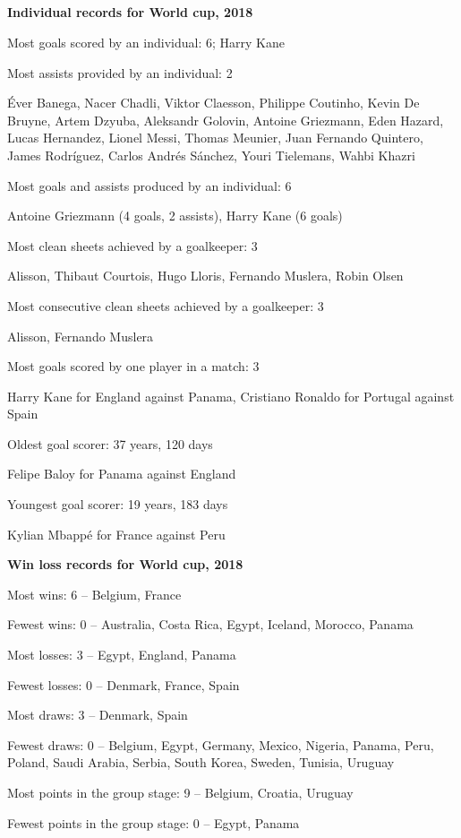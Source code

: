
\subsection*{}

\begin{questions}

\question \textbf{Individual records for World cup, 2018}

\begin{solution}

Most goals scored by an individual: 6; Harry Kane

Most assists provided by an individual: 2

Éver Banega, Nacer Chadli, Viktor Claesson, Philippe Coutinho, Kevin De Bruyne, Artem Dzyuba, Aleksandr Golovin, Antoine Griezmann, Eden Hazard, Lucas Hernandez, Lionel Messi, Thomas Meunier, Juan Fernando Quintero, James Rodríguez, Carlos Andrés Sánchez, Youri Tielemans, Wahbi Khazri

Most goals and assists produced by an individual: 6

Antoine Griezmann (4 goals, 2 assists), Harry Kane (6 goals)

Most clean sheets achieved by a goalkeeper: 3

Alisson, Thibaut Courtois, Hugo Lloris, Fernando Muslera, Robin Olsen

Most consecutive clean sheets achieved by a goalkeeper: 3

Alisson, Fernando Muslera

Most goals scored by one player in a match: 3

Harry Kane for England against Panama, Cristiano Ronaldo for Portugal against Spain

Oldest goal scorer: 37 years, 120 days

Felipe Baloy for Panama against England

Youngest goal scorer: 19 years, 183 days

Kylian Mbappé for France against Peru

\end{solution}

\question \textbf{Win loss records for World cup, 2018}

\begin{solution}

Most wins: 6 – Belgium, France

Fewest wins: 0 – Australia, Costa Rica, Egypt, Iceland, Morocco, Panama

Most losses: 3 – Egypt, England, Panama

Fewest losses: 0 – Denmark, France, Spain

Most draws: 3 – Denmark, Spain

Fewest draws: 0 – Belgium, Egypt, Germany, Mexico, Nigeria, Panama, Peru, Poland, Saudi Arabia, Serbia, South Korea, Sweden, Tunisia, Uruguay

Most points in the group stage: 9 – Belgium, Croatia, Uruguay

Fewest points in the group stage: 0 – Egypt, Panama

\end{solution}
\end{questions}
